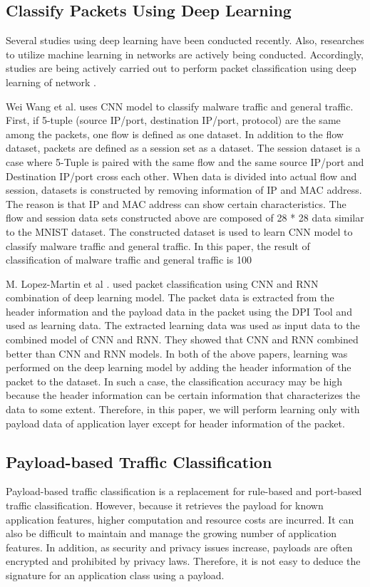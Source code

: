 \subsection{Classify Packets Using Deep Learning}\label{subsec:classifyPacketsUsingDeepLearning}
Several studies using deep learning have been conducted recently.
Also, researches to utilize machine learning in networks are actively being conducted.
Accordingly, studies are being actively carried out to perform packet classification using deep learning of network \cite{Parsaei2017,Erman:2006:TCU:1162678.1162679,Yu:2018:QTC:3223065.3223318,10.1007:978-3-540-24668-8_21,W7899588,M8026581}.

Wei Wang et al. \cite{W7899588} uses CNN model to classify malware traffic and general traffic.
First, if 5-tuple (source IP/port, destination IP/port, protocol) are the same among the packets, one flow is defined as one dataset.
In addition to the flow dataset, packets are defined as a session set as a dataset.
The session dataset is a case where 5-Tuple is paired with the same flow and the same source IP/port and Destination IP/port cross each other.
When data is divided into actual flow and session, datasets is constructed by removing information of IP and MAC address.
The reason is that IP and MAC address can show certain characteristics.
The flow and session data sets constructed above are composed of 28 * 28 data similar to the MNIST dataset.
The constructed dataset is used to learn CNN model to classify malware traffic and general traffic.
In this paper, the result of classification of malware traffic and general traffic is 100%

M. Lopez-Martin et al \cite{M8026581}. used packet classification using CNN and RNN combination of deep learning model. The packet data is extracted from the header information and the payload data in the packet using the DPI Tool and used as learning data. The extracted learning data was used as input data to the combined model of CNN and RNN. They showed that CNN and RNN combined better than CNN and RNN models.
In both of the above papers, learning was performed on the deep learning model by adding the header information of the packet to the dataset. In such a case, the classification accuracy may be high because the header information can be certain information that characterizes the data to some extent. Therefore, in this paper, we will perform learning only with payload data of application layer except for header information of the packet.

\subsection{Payload-based Traffic Classification}\label{subsec:payloadbased}
Payload-based traffic classification is a replacement for rule-based and port-based traffic classification.
However, because it retrieves the payload for known application features, higher computation and resource costs are incurred.
It can also be difficult to maintain and manage the growing number of application features.
In addition, as security and privacy issues increase, payloads are often encrypted and prohibited by privacy laws.
Therefore, it is not easy to deduce the signature for an application class using a payload.

